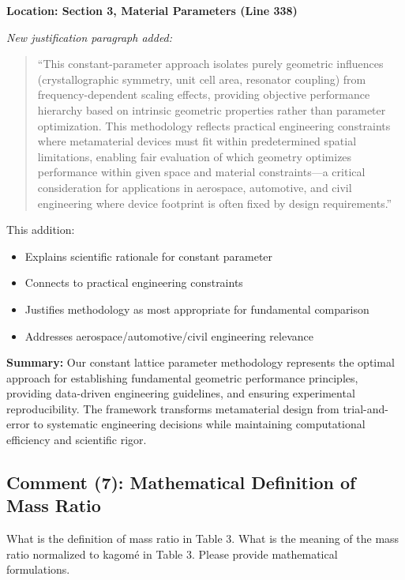 \documentclass[11pt,a4paper]{article}
\newenvironment{reviewerbox}{%
    \par\medskip\noindent{\color{reviewercolor}\rule{\linewidth}{2pt}}\par
    \noindent{\color{reviewercolor}\bfseries Reviewer Comment}\par\smallskip
}{%
    \par\noindent{\color{reviewercolor}\rule{\linewidth}{0.5pt}}\medskip
}
\newenvironment{changesbox}{%
    \par\medskip\noindent{\color{changescolor}\rule{\linewidth}{2pt}}\par
    \noindent{\color{changescolor}\bfseries Manuscript Changes}\par\smallskip
}{%
    \par\noindent{\color{changescolor}\rule{\linewidth}{0.5pt}}\medskip
}
\begin{document}
\begin{changesbox}
\textbf{Location: Section 3, Material Parameters (Line 338)}

\textit{New justification paragraph added:}
\begin{quote}
\textcolor{redtext}{``This constant-parameter approach isolates purely geometric influences (crystallographic symmetry, unit cell area, resonator coupling) from frequency-dependent scaling effects, providing objective performance hierarchy based on intrinsic geometric properties rather than parameter optimization. This methodology reflects practical engineering constraints where metamaterial devices must fit within predetermined spatial limitations, enabling fair evaluation of which geometry optimizes performance within given space and material constraints—a critical consideration for applications in aerospace, automotive, and civil engineering where device footprint is often fixed by design requirements.''}
\end{quote}

This addition:
\begin{itemize}
    \item Explains scientific rationale for constant parameter
    \item Connects to practical engineering constraints
    \item Justifies methodology as most appropriate for fundamental comparison
    \item Addresses aerospace/automotive/civil engineering relevance
\end{itemize}
\end{changesbox}

\textbf{Summary:} Our constant lattice parameter methodology represents the optimal approach for establishing fundamental geometric performance principles, providing data-driven engineering guidelines, and ensuring experimental reproducibility. The framework transforms metamaterial design from trial-and-error to systematic engineering decisions while maintaining computational efficiency and scientific rigor.

\newpage

\subsection*{Comment (7): Mathematical Definition of Mass Ratio}

\begin{reviewerbox}
What is the definition of mass ratio in Table 3. What is the meaning of the mass ratio normalized to kagomé in Table 3. Please provide mathematical formulations.
\end{reviewerbox}
\end{document}
